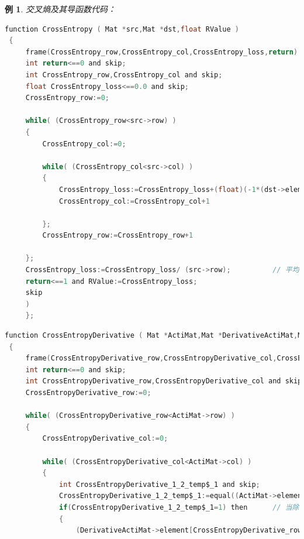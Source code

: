 \documentclass[UTF-8]{progbookcn}
\newtheorem{example}{例}[chapter]         %
\begin{document}
\begin{example}
交叉熵及其导函数代码：
\begin{lstlisting}[language=C,caption={函数 3 CrossEntropy}]
function CrossEntropy ( Mat *src,Mat *dst,float RValue )
 {
     frame(CrossEntropy_row,CrossEntropy_col,CrossEntropy_loss,return) and (
     int return<==0 and skip;
     int CrossEntropy_row,CrossEntropy_col and skip;
     float CrossEntropy_loss<==0.0 and skip;
     CrossEntropy_row:=0;

     while( (CrossEntropy_row<src->row) )
     {
         CrossEntropy_col:=0;

         while( (CrossEntropy_col<src->col) )
         {
             CrossEntropy_loss:=CrossEntropy_loss+(float)(-1*(dst->element[CrossEntropy_row])[CrossEntropy_col]*log((src->element[CrossEntropy_row])[CrossEntropy_col]));           //	依照公式求总  之后再平均
             CrossEntropy_col:=CrossEntropy_col+1

         };
         CrossEntropy_row:=CrossEntropy_row+1

     };
     CrossEntropy_loss:=CrossEntropy_loss/ (src->row);          // 平均
     return<==1 and RValue:=CrossEntropy_loss;
     skip
     )
     };
\end{lstlisting}

\begin{lstlisting}[language=C,caption={函数 5 CrossEntropyDerivative}]
 function CrossEntropyDerivative ( Mat *ActiMat,Mat *DerivativeActiMat,Mat One_hotMat,Mat* RValue )
 {
     frame(CrossEntropyDerivative_row,CrossEntropyDerivative_col,CrossEntropyDerivative_1_2_temp$_1,return) and (
     int return<==0 and skip;
     int CrossEntropyDerivative_row,CrossEntropyDerivative_col and skip;
     CrossEntropyDerivative_row:=0;

     while( (CrossEntropyDerivative_row<ActiMat->row) )
     {
         CrossEntropyDerivative_col:=0;

         while( (CrossEntropyDerivative_col<ActiMat->col) )
         {
             int CrossEntropyDerivative_1_2_temp$_1 and skip;
             CrossEntropyDerivative_1_2_temp$_1:=equal((ActiMat->element[CrossEntropyDerivative_row])[CrossEntropyDerivative_col],0.0,RValue);
             if(CrossEntropyDerivative_1_2_temp$_1=1) then      // 当除数为零时  为防止除零报错 直接给被除数乘无限大
             {
                 (DerivativeActiMat->element[CrossEntropyDerivative_row])[CrossEntropyDerivative_col]:=-(One_hotMat.element[CrossEntropyDerivative_row])[CrossEntropyDerivative_col]*10000000000


\end{lstlisting}
\end{example}
\end{document}
